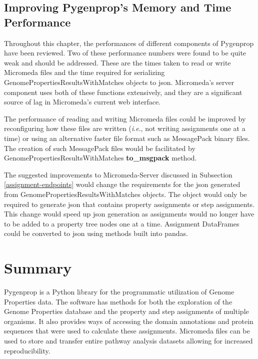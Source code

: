 \subsection{Improving Pygenprop's Memory and Time Performance} 
\label{improving-pygenprop-performance}

Throughout this chapter, the performances of different components of Pygenprop 
have been reviewed. Two of these performance numbers were found to be quite weak 
and should be addressed. These are the times taken to read or write 
Micromeda files and the time required for serializing 
GenomePropertiesResultsWithMatches objects to \gls{json}. Micromeda's server 
component uses both of these functions extensively, and they are a significant 
source of lag in Micromeda's current web interface.

The performance of reading and writing Micromeda files could be improved by 
reconfiguring how these files are written (\textit{i}.\textit{e}., not writing assignments one at 
a time) or using an alternative faster file format such as MessagePack binary 
files. The creation of such MessagePack files would be facilitated by 
GenomePropertiesResultsWithMatches \textbf{to\_msgpack} method. 
 
The suggested improvements to Micromeda-Server discussed in Subsection 
\ref{assignment-endpoints} would change the requirements for the \gls{json} 
generated from GenomePropertiesResultsWithMatches objects. The object would only 
be required to generate \gls{json} that contains property assignments or step 
assignments. This change would speed up \gls{json} generation as assignments 
would no longer have to be added to a property tree nodes one at a time. 
Assignment DataFrames could be converted to \gls{json} using methods built into 
pandas.

\section{Summary}

Pygenprop is a Python library for the programmatic utilization of Genome 
Properties data. The software has methods for both the exploration of the Genome 
Properties database and the property and step assignments of multiple organisms. 
It also provides ways of accessing the domain annotations and protein sequences 
that were used to calculate these assignments. Micromeda files can be used to 
store and transfer entire pathway analysis datasets allowing for increased 
reproducibility.


